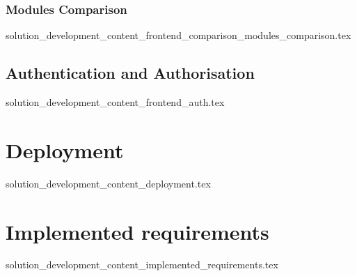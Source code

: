   \subsubsection*{Modules Comparison}\label{sub:frontend_comparison_modules_comparison}
    {solution_development_content_frontend_comparison_modules_comparison.tex}

\subsection{Authentication and Authorisation}\label{sub:frontend_auth}
  {solution_development_content_frontend_auth.tex}

\section{Deployment}
  {solution_development_content_deployment.tex}

\section{Implemented requirements}
  {solution_development_content_implemented_requirements.tex}
